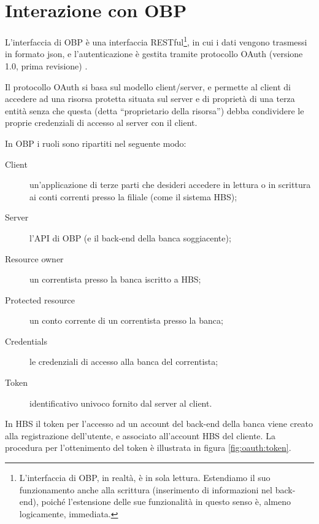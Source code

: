 
\section{Interazione con OBP}
\label{sec:OBP}

L'interfaccia di OBP è una interfaccia RESTful\footnote{L'interfaccia di OBP, in realtà, è in sola lettura. Estendiamo il suo funzionamento anche alla scrittura (inserimento di informazioni nel back-end), poiché l'estensione delle sue funzionalità in questo senso è, almeno logicamente, immediata.}, in cui i dati vengono trasmessi in formato json, e l'autenticazione è gestita tramite protocollo OAuth (versione 1.0, prima revisione) \cite{oauthrfc}.

Il protocollo OAuth si basa sul modello client/server, e permette al client di accedere ad una risorsa protetta situata sul server e di propriet\`a di una terza entit\`a senza che questa (detta ``proprietario della risorsa'') debba condividere le proprie credenziali di accesso al server con il client.

In OBP i ruoli sono ripartiti nel seguente modo:
\begin{description}
	\item[Client] un'applicazione di terze parti che desideri accedere in lettura o in scrittura ai conti correnti presso la filiale (come il sistema HBS);
	\item[Server] l'API di OBP (e il back-end della banca soggiacente);
	\item[Resource owner] un correntista presso la banca iscritto a HBS;
	\item[Protected resource] un conto corrente di un correntista presso la banca;
	\item[Credentials] le credenziali di accesso alla banca del correntista;
	\item[Token] identificativo univoco fornito dal server al client.
\end{description}

In HBS il token per l'accesso ad un account del back-end della banca viene creato alla registrazione dell'utente, e associato all'account HBS del cliente.
La procedura per l'ottenimento del token \`e illustrata in figura \ref{fig:oauth:token}.

